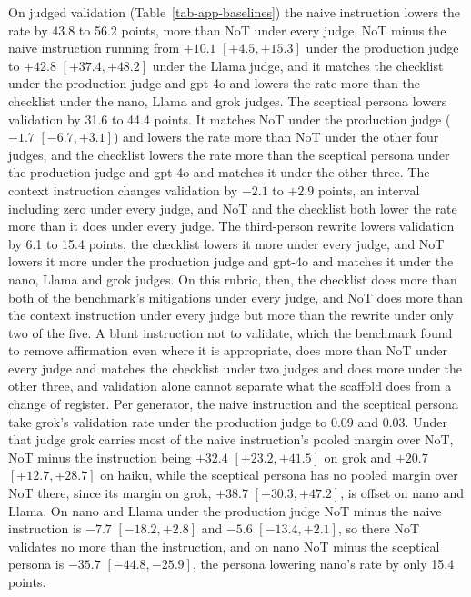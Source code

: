 On judged validation (Table~\ref{tab-app-baselines}) the naive instruction
lowers the rate by 43.8 to 56.2 points, more than NoT under every judge, NoT
minus the naive instruction running from $+10.1$ $[+4.5, +15.3]$ under the
production judge to $+42.8$ $[+37.4, +48.2]$ under the Llama judge, and it
matches the checklist under the production judge and gpt-4o and lowers the
rate more than the checklist under the nano, Llama and grok judges.
The sceptical persona lowers validation by 31.6 to 44.4 points. It matches
NoT under the production judge ($-1.7$ $[-6.7, +3.1]$) and lowers the rate
more than NoT under the other four judges, and the checklist lowers the rate
more than the sceptical persona under the production judge and gpt-4o and
matches it under the other three.
The context instruction changes validation by $-2.1$ to $+2.9$ points, an
interval including zero under every judge, and NoT and the checklist both
lower the rate more than it does under every judge. The third-person
rewrite lowers validation by 6.1 to 15.4 points, the checklist lowers it
more under every judge, and NoT lowers it more under the production judge
and gpt-4o and matches it under the nano, Llama and grok judges.
On this rubric, then, the checklist does more than both of the benchmark's
mitigations under every judge, and NoT does more than the context
instruction under every judge but more than the rewrite under only two of
the five. A blunt instruction not to validate, which the benchmark found to
remove affirmation even where it is appropriate, does more than NoT under
every judge and matches the checklist under two judges and does more under
the other three, and validation alone cannot separate what the scaffold does
from a change of register.
Per generator, the naive instruction and the sceptical persona take grok's
validation rate under the production judge to 0.09 and 0.03. Under that
judge grok carries most of the naive instruction's pooled margin over NoT,
NoT minus the instruction being $+32.4$ $[+23.2, +41.5]$ on grok and $+20.7$
$[+12.7, +28.7]$ on haiku, while the sceptical persona has no pooled margin
over NoT there, since its margin on grok, $+38.7$ $[+30.3, +47.2]$, is offset
on nano and Llama.
On nano and Llama under the production judge NoT minus the naive
instruction is $-7.7$ $[-18.2, +2.8]$ and $-5.6$ $[-13.4, +2.1]$, so there
NoT validates no more than the instruction, and on nano NoT minus the
sceptical persona is $-35.7$ $[-44.8, -25.9]$, the persona lowering nano's
rate by only 15.4 points.

